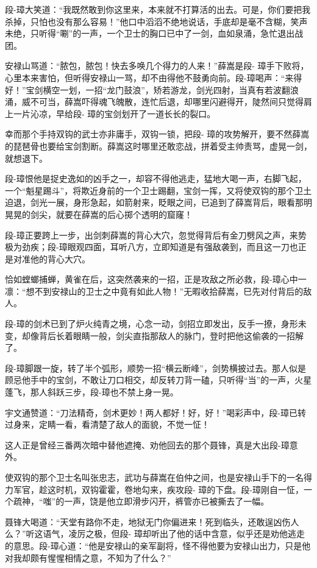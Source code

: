 \documentclass[12pt,oneside]{book}
\begin{document}
段-璋大笑道：``我既然敢到你这里来，本来就不打算活的出去。可是，你们要把我杀掉，只怕也没有那么容易！''他口中滔滔不绝地说话，手底却是毫不含糊，笑声未绝，只听得``唰''的一声，一个卫士的胸口已中了一剑，血如泉涌，急忙退出战团。

安禄山骂道：``脓包，脓包！快去多唤几个得力的人来！''薛嵩是段-
璋手下败将，心里本来害怕，但听得安禄山一骂，却不由得他不鼓勇向前。段-璋喝声：``来得好！''宝剑横空一划，一招``龙门鼓浪''，矫若游龙，剑光四射，当真有若波翻浪涌，威不可当，薛嵩吓得魂飞魄散，连忙后退，却哪里闪避得开，陡然间只觉得肩上一片沁凉，早给段-
璋的宝剑划开了一道长长的裂口。

幸而那个手持双钩的武士亦非庸手，双钩一锁，把段-
璋的攻势解开，要不然薛嵩的琵琶骨也要给宝剑割断。薛嵩这时哪里还敢恋战，拼着受主帅责骂，虚晃一剑，就想退下。

段-璋恨他是捉史逸如的凶手之一，却容不得他逃走，猛地大喝一声，右脚飞起，一个``魁星踢斗''，将欺近身前的一个卫士踢翻，宝剑一挥，又将使双钩的那个卫土迫退，剑光一展，身形急起，如箭射来，眨眼之间，已追到了薛嵩背后，眼看那明晃晃的剑尖，就要在薛嵩的后心掷个透明的窟窿！

段-璋正要跨上一步，出剑刺薛嵩的背心大穴，忽觉得背后有金刀劈风之声，来势极为劲疾；段-璋眼观四面，耳听八方，立即知道是有强敌袭到，而且这一刀也正是对准他的背心大穴。

恰如螳螂捕蝉，黄雀在后，这突然袭来的一招，正是攻敌之所必救，段-璋心中一凛：``想不到安禄山的卫士之中竟有如此人物！''无暇收拾薛嵩，巳先对付背后的敌人。

段-璋的剑术已到了炉火纯青之境，心念一动，剑招立即发出，反手一撩，身形未变，却像背后长着眼睛一般，剑尖直指那敌人的脉门，登时把他这偷袭的一招解了。

段-璋脚跟一旋，转了半个弧形，顺势一招``横云断峰''，剑势横披过去。那人似是顾忌他手中的宝剑，不敢让刀口相交，却反转刀背一磕，只听得``当''的一声，火星蓬飞，那人斜跃三步，段-璋也不禁上身一晃。

宇文通赞道：``刀法精奇，剑术更妙！两人都好！好，好！''喝彩声中，段-璋已转过身来，定睛一看，看清楚了敌人的面貌，不觉一怔！

这人正是曾经三番两次暗中替他遮掩、劝他回去的那个聂锋，真是大出段-璋意外。

使双钩的那个卫士名叫张忠志，武功与薛嵩在伯仲之间，也是安禄山手下的一名得力军官，趁这时机，双钩霍霍，卷地勾来，疾攻段-
璋的下盘。段-璋刚自一怔，一个疏神，``嗤''的一声，饶是他立即滑步闪开，裤管亦已被撕去了一幅。

聂锋大喝道：``天堂有路你不走，地狱无门你偏进来！死到临头，还敢逞凶伤人么？''听这语气，凌厉之极，但段-
璋却听出了他的话中含意，似乎还是劝他逃走的意思。段-璋心道：``他是安禄山的亲军副将，怪不得他要为安禄山出力，只是他对我却颇有惺惺相情之意，不知为了什么？''
\end{document}
